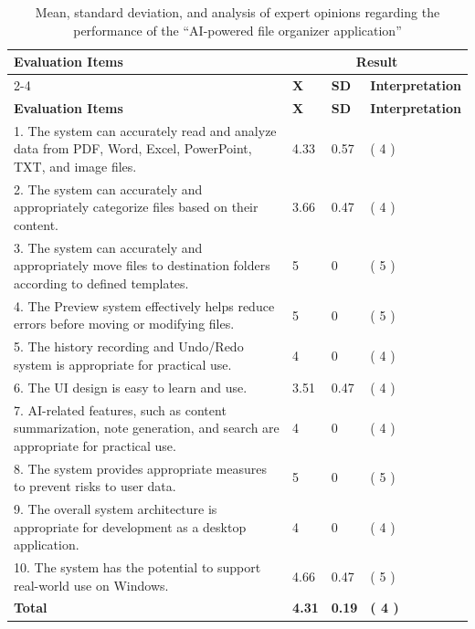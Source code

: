 \documentclass[12pt,oneside,openright,a4paper]{cpe-english-project}
\begin{document}
\begin{longtable}{|p{}|p{}|p{}|p{}|}
\caption{Mean, standard deviation, and analysis of expert opinions regarding the performance of the ``AI-powered file organizer application''}\\
\hline
\multirow{2}{*}{\textbf{Evaluation Items}} & \multicolumn{3}{c|}{\textbf{Result}} \\
\cline{2-4}
 & \textbf{X} & \textbf{SD} & \textbf{Interpretation} \\
\hline
\endfirsthead
\hline
\textbf{Evaluation Items} & \textbf{X} & \textbf{SD} & \textbf{Interpretation} \\
\hline
\endhead
1. The system can accurately read and analyze data from PDF, Word, Excel, PowerPoint, TXT, and image files. & 4.33 & 0.57 & ( 4 ) \\
\hline
2. The system can accurately and appropriately categorize files based on their content. & 3.66 & 0.47 & ( 4 ) \\
\hline
3. The system can accurately and appropriately move files to destination folders according to defined templates. & 5 & 0 & ( 5 ) \\
\hline
4. The Preview system effectively helps reduce errors before moving or modifying files. & 5 & 0 & ( 5 ) \\
\hline
5. The history recording and Undo/Redo system is appropriate for practical use. & 4 & 0 & ( 4 ) \\
\hline
6. The UI design is easy to learn and use. & 3.51 & 0.47 & ( 4 ) \\
\hline
7. AI-related features, such as content summarization, note generation, and search are appropriate for practical use. & 4 & 0 & ( 4 ) \\
\hline
8. The system provides appropriate measures to prevent risks to user data. & 5 & 0 & ( 5 ) \\
\hline
9. The overall system architecture is appropriate for development as a desktop application. & 4 & 0 & ( 4 ) \\
\hline
10. The system has the potential to support real-world use on Windows. & 4.66 & 0.47 & ( 5 ) \\
\hline
\textbf{Total} & \textbf{4.31} & \textbf{0.19} & \textbf{( 4 )} \\
\hline
\end{longtable}
\end{document}
